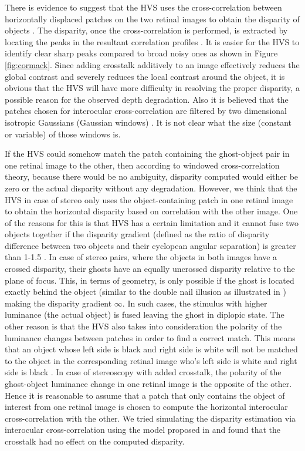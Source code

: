 There is evidence to suggest that the HVS uses the cross-correlation between horizontally displaced patches on the two retinal images to obtain the disparity of objects \cite{filippini2009limits}\cite{kane2014limits}. The disparity, once the cross-correlation is performed, is extracted by locating the peaks in the resultant correlation profiles \cite{cormack1991interocular}. It is easier for the HVS to identify clear sharp peaks compared to broad noisy ones as shown in Figure \ref{fig:cormack}. Since adding crosstalk additively to an image effectively reduces the global contrast and severely reduces the local contrast around the object, it is obvious that the HVS will have more difficulty in resolving the proper disparity, a possible reason for the observed depth degradation. Also it is believed that the patches chosen for interocular cross-correlation are filtered by two dimensional isotropic Gaussians (Gaussian windows) \cite{filippini2009limits}. It is not clear what the size (constant or variable) of those windows is.

If the HVS could somehow match the patch containing the ghost-object pair in one retinal image to the other, then according to windowed cross-correlation theory, because there would be no ambiguity, disparity computed would either be zero or the actual disparity without any degradation. However, we think that the HVS in case of stereo only uses the object-containing patch in one retinal image to obtain the horizontal disparity based on correlation with the other image. One of the reasons for this is that HVS has a certain limitation and it cannot fuse two objects together if the disparity gradient (defined as the ratio of disparity difference between two objects and their cyclopean angular separation) is greater than 1-1.5 \cite{howard1995binocular} \cite{kane2014limits}. In case of stereo pairs, where the objects in both images have a crossed disparity, their ghosts have an equally uncrossed disparity relative to the plane of focus. This, in terms of geometry, is only possible if the ghost is located exactly behind the object (similar to the double nail illusion as illustrated in \cite{tsirlin2012effect} \cite{krol1980double}) making the disparity gradient $\infty$. In such cases, the stimulus with higher luminance (the actual object) is fused leaving the ghost in diplopic state. The other reason is that the HVS also takes into consideration the polarity of the luminance changes between patches in order to find a correct match. This means that an object whose left side is black and right side is white will not be matched to the object in the corresponding retinal image who's left side is white and right side is black \cite{howard1995binocular}. In case of stereoscopy with added crosstalk, the polarity of the ghost-object luminance change in one retinal image is the opposite of the other. Hence it is reasonable to assume that a patch that only contains the object of interest from one retinal image is chosen to compute the horizontal interocular cross-correlation with the other. We tried simulating the disparity estimation via interocular cross-correlation using the model proposed in \cite{filippini2009limits} and found that the crosstalk had no effect on the computed disparity.

